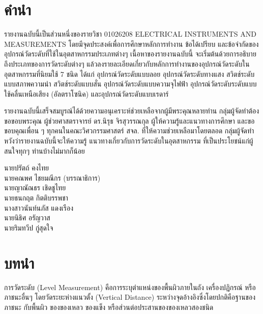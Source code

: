 \documentclass[final,11pt]{article}
\begin{document}
\section*{คำนำ}
รายงานฉบับนี้เป็นส่วนหนึ่งของรายวิชา 01026208 ELECTRICAL INSTRUMENTS AND MEASUREMENTS 
โดยมีจุดประสงค์เพื่อการศึกษาหลักการทำงาน ข้อได้เปรียบ และข้อจำกัดของอุปกรณ์วัดระดับที่ใช้ในอุตสาหกรรมประเภทต่างๆ 
เนื้อหาของรายงานฉบับนี้ จะเริ่มต้นด้วยการอธิบายถึงประเภทของการวัดระดับต่างๆ แล้วลงรายละเอียดเกี่ยวกับหลักการทำงานของอุปกรณ์วัดระดับในอุตสาหกรรมที่นิยมใช้
7 ชนิด ได้แก่ อุปกรณ์วัดระดับแบบลอย อุปกรณ์วัดระดับทางแสง สวิตช์ระดับแบบสภาพความนำ สวิตช์ระดับแบบสั่น อุปกรณ์วัดระดับแบบความจุไฟฟ้า 
อุปกรณ์วัดระดับระดับแบบใช้คลื่นเหนือเสียง (อัลตราโซนิค) และอุปกรณ์วัดระดับแบบเรดาร์

รายงานฉบับนี้เสร็จสมบูรณ์ได้ด้วยความอนุเคราะห์ช่วยเหลือจากผู้มีพระคุณหลายท่าน กลุ่มผู้จัดทำต้องขอขอบพระคุณ 
ผู้ช่วยศาสตราจารย์ ดร.นิรุธ จิรสุวรรณกุล ผู้ให้ความรู้และแนวทางการศึกษา และขอขอบคุณเพื่อน ๆ ทุกคนในคณะวิศวกรรมศาสตร์ สจล. ที่ให้ความช่วยเหลือมาโดยตลอด 
กลุ่มผู้จัดทำหวังว่ารายงานฉบับนี้จะให้ความรู้ แนวทางเกี่ยวกับการวัดระดับในอุตสาหกรรม ที่เป็นประโยชน์แก่ผู้สนใจทุกๆ ท่านบ้างไม่มากก็น้อย 

\vspace{1cm}
\hspace{9cm}
\vbox{\noindent
    นายปรัตถ์ คงไทย\\
    นายคณพศ ไชยมณีกร (บรรณาธิการ)\\
    นายญาณัณธร เชิดชูไทย\\
    นายธนกฤต กิตติบรรพชา\\
    นางสาวนันท์นภัส แดงเรือง\\
    นายนิธิศ อรัญวาส\\
    นายริมทวีป กู่สุดใจ\\

}
\newpage
\renewcommand\contentsname{สารบัญ}
\tableofcontents
\newpage
\section{บทนำ}
การวัดระดับ (Level Measurement) คือการระบุตำแหน่งของพื้นผิวภายในถัง เครื่องปฏิกรณ์
หรือภาชนะอื่นๆ โดยวัดระยะห่างแนวตั้ง (Vertical Distance) ระหว่างจุดอ้างอิงซึ่งโดยปกติคือฐานของภาชนะ กับพื้นผิว
ของของเหลว ของแข็ง หรือส่วนต่อประสานของของเหลวสองชนิด
\end{document}
